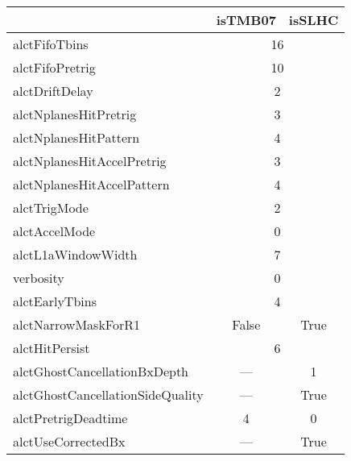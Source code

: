 \begin{center}
	\begin{tabular}{|l|c|c|}
		\hline
		& isTMB07 & isSLHC \\
		\hline
		\hline
		alctFifoTbins & \multicolumn{2}{c|}{16} \\
		\hline
		alctFifoPretrig & \multicolumn{2}{c|}{10} \\
		\hline
		alctDriftDelay & \multicolumn{2}{c|}{2} \\
		\hline
		alctNplanesHitPretrig & \multicolumn{2}{c|}{3} \\
		\hline
		alctNplanesHitPattern & \multicolumn{2}{c|}{4} \\
		\hline
		alctNplanesHitAccelPretrig & \multicolumn{2}{c|}{3} \\
		\hline
		alctNplanesHitAccelPattern & \multicolumn{2}{c|}{4} \\
		\hline
		alctTrigMode & \multicolumn{2}{c|}{2} \\
		\hline
		alctAccelMode & \multicolumn{2}{c|}{0} \\
		\hline
		alctL1aWindowWidth & \multicolumn{2}{c|}{7} \\
		\hline
		verbosity & \multicolumn{2}{c|}{0} \\
		\hline
		alctEarlyTbins & \multicolumn{2}{c|}{4} \\
		\hline
		alctNarrowMaskForR1 & False & True \\
		\hline
		alctHitPersist & \multicolumn{2}{c|}{6} \\
		\hline
		alctGhostCancellationBxDepth  & --- & 1 \\
		\hline
		alctGhostCancellationSideQuality & --- & True \\
		\hline
		alctPretrigDeadtime & 4 & 0 \\
		\hline
		alctUseCorrectedBx & --- & True \\
		\hline
	
	\end{tabular}
\end{center}

